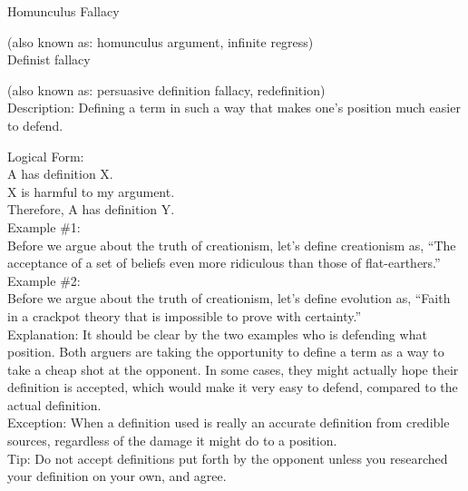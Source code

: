 \documentclass[a4paper,12pt,single,pdftex]{scrbook}
\begin{document}
Homunculus Fallacy
    
      (also known as: homunculus argument, infinite regress)
    \\

  

Definist fallacy
    
      (also known as: persuasive definition fallacy, redefinition)
    \\

  
    Description: Defining a term in such a way that makes one’s position much easier to defend.

    
      Logical Form:
    \\

    
      A has definition X.
    \\

    
      X is harmful to my argument.
    \\

    
      Therefore, A has definition Y.
    \\

    
      Example \#1:
    \\

    
      Before we argue about the truth of creationism, let’s define creationism as, “The acceptance of a set of beliefs even more ridiculous than those of flat-earthers.”
    \\

    
      Example \#2:
    \\

    
      Before we argue about the truth of creationism, let’s define evolution as, “Faith in a crackpot theory that is impossible to prove with certainty.”
    \\

    
      Explanation: It should be clear by the two examples who is defending what position.  Both arguers are taking the opportunity to define a term as a way to take a cheap shot at the opponent.  In some cases, they might actually hope their definition is accepted, which would make it very easy to defend, compared to the actual definition.
    \\

    
      Exception: When a definition used is really an accurate definition from credible sources, regardless of the damage it might do to a position.
    \\

    
      Tip: Do not accept definitions put forth by the opponent unless you researched your definition on your own, and agree.
    \\
\end{document}
